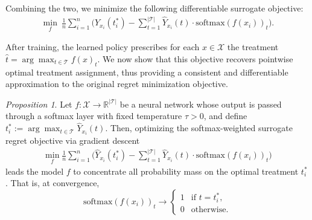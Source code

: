 \documentclass{article}
\theoremstyle{remark}
\newtheorem{proposition}{Proposition}
\begin{document}
Combining the two, we minimize the following differentiable surrogate objective:
\begin{align}
    \min_f \ \frac{1}{n} \sum_{i=1}^n \Bigg( \hat{Y}_{x_i}(t_i^*) - \sum_{t=1}^{|\mathcal{T}|} \hat{Y}_{x_i}(t) \cdot \mathrm{softmax}(f(x_i))_t \Bigg).
\end{align}

After training, the learned policy prescribes for each $x \in \mathcal{X}$ the treatment $ \hat{t} = \arg\max_{t \in \mathcal{T}} f(x)_t.$ 
We now show that this objective recovers pointwise optimal treatment assignment, thus providing a consistent and differentiable approximation to the original regret minimization objective. %

\begin{proposition}
Let $f: \mathcal{X} \to \mathbb{R}^{|\mathcal{T}|}$ be a neural network whose output is passed through a softmax layer with fixed temperature $\tau > 0$, and define $t^*_i := \arg\max_{t \in \mathcal{T}} \hat{Y}_{x_i}(t)$. Then, optimizing the softmax-weighted surrogate regret objective via gradient descent 
\begin{align}
    \min_f \frac{1}{n} \sum_{i=1}^n \bigg( \hat{Y}_{x_i}(t^*_i) - \sum_{t=1}^{|\mathcal{T}|} \hat{Y}_{x_i}(t) \cdot \mathrm{softmax}(f(x_i))_t \bigg)
\end{align}
leads the model $f$ to concentrate all probability mass on the optimal treatment $t^*_i$. That is, at convergence,\begin{equation}
    \mathrm{softmax}(f(x_i))_t \to 
    \begin{cases}
        1 & \text{if } t = t^*_i, \\
        0 & \text{otherwise}.
    \end{cases}
\end{equation}
\end{proposition}


\end{document}
